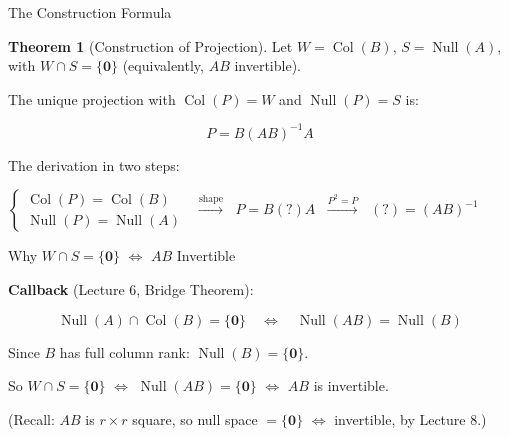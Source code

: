 \documentclass[10pt]{beamer}
\theoremstyle{definition}
\newtheorem{thm}{Theorem}[section]
\newcommand{\x}[1]{\alert{\textbf{#1}}}
\begin{document}
\begin{frame}{The Construction Formula}

\begin{thm}[Construction of Projection]
Let $W = \operatorname{Col}(B)$, $S = \operatorname{Null}(A)$, with $W \cap S = \{\mathbf{0}\}$ (equivalently, $AB$ invertible).

The unique projection with $\operatorname{Col}(P) = W$ and $\operatorname{Null}(P) = S$ is:

$$\boxed{P = B(AB)^{-1}A}$$
\end{thm}

\vspace{0.5em}

The derivation in two steps:

\vspace{0.2em}

$\begin{cases} \operatorname{Col}(P) = \operatorname{Col}(B) \\ \operatorname{Null}(P) = \operatorname{Null}(A) \end{cases}$ $\;\xrightarrow{\text{shape}}\;$ $P = B(?)A$ $\;\xrightarrow{P^2 = P}\;$ $(?) = (AB)^{-1}$

\end{frame}


\begin{frame}{Why $W \cap S = \{\mathbf{0}\}$ $\iff$ $AB$ Invertible}

\x{Callback} (Lecture 6, Bridge Theorem):

$$\operatorname{Null}(A) \cap \operatorname{Col}(B) = \{\mathbf{0}\} \quad\Longleftrightarrow\quad \operatorname{Null}(AB) = \operatorname{Null}(B)$$

\vspace{0.5em}

Since $B$ has full column rank: $\operatorname{Null}(B) = \{\mathbf{0}\}$.

\vspace{0.3em}

So $W \cap S = \{\mathbf{0}\}$ $\iff$ $\operatorname{Null}(AB) = \{\mathbf{0}\}$ $\iff$ $AB$ is invertible.

\vspace{0.5em}

(Recall: $AB$ is $r \times r$ square, so null space $= \{\mathbf{0}\}$ $\iff$ invertible, by Lecture 8.)

\end{frame}
\end{document}
